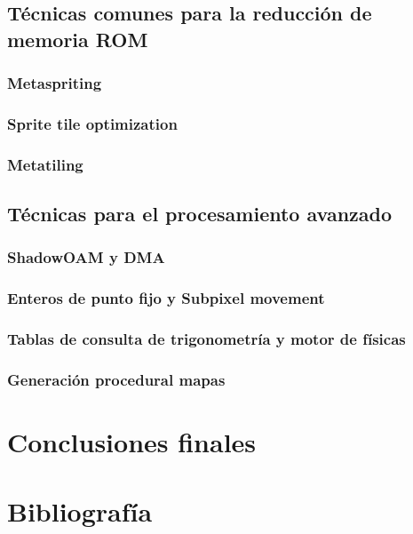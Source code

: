 \documentclass[12pt]{article}
\begin{document}
    \subsection{Técnicas comunes para la reducción de memoria ROM}
        \subsubsection{Metaspriting}
        \subsubsection{Sprite tile optimization}
        \subsubsection{Metatiling}
    \subsection{Técnicas para el procesamiento avanzado}
        \subsubsection{ShadowOAM y DMA}
        \subsubsection{Enteros de punto fijo y Subpixel movement}
        \subsubsection{Tablas de consulta de trigonometría y motor de físicas}
        \subsubsection{Generación procedural mapas}

\section{Conclusiones finales}

\section{Bibliografía}
\end{document}
